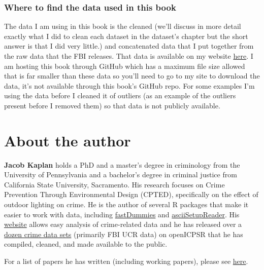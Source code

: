 \documentclass[
  12pt,
]{book}
\begin{document}
\hypertarget{where-to-find-the-data-used-in-this-book}{%
\subsection*{Where to find the data used in this book}\label{where-to-find-the-data-used-in-this-book}}

The data I am using in this book is the cleaned (we'll discuss in more detail exactly what I did to clean each dataset in the dataset's chapter but the short answer is that I did very little.) and concatenated data that I put together from the raw data that the FBI releases. That data is available on my website \href{https://jacobdkaplan.com/data.html}{here}. I am hosting this book through GitHub which has a maximum file size allowed that is far smaller than these data so you'll need to go to my site to download the data, it's not available through this book's GitHub repo. For some examples I'm using the data before I cleaned it of outliers (as an example of the outliers present before I removed them) so that data is not publicly available.

\hypertarget{about-the-author}{%
\chapter*{About the author}\label{about-the-author}}

\textbf{Jacob Kaplan} holds a PhD and a master's degree in criminology from the University of Pennsylvania and a bachelor's degree in criminal justice from California State University, Sacramento. His research focuses on Crime Prevention Through Environmental Design (CPTED), specifically on the effect of outdoor lighting on crime. He is the author of several R packages that make it easier to work with data, including \href{https://jacobkap.github.io/fastDummies/}{fastDummies} and \href{https://jacobkap.github.io/asciiSetupReader/}{asciiSetupReader}. His \href{http://jacobdkaplan.com/}{website} allows easy analysis of crime-related data and he has released over a \href{http://jacobdkaplan.com/data.html}{dozen crime data sets} (primarily FBI UCR data) on openICPSR that he has compiled, cleaned, and made available to the public.

For a list of papers he has written (including working papers), please see \href{http://jacobdkaplan.com/research.html}{here}.
\end{document}
